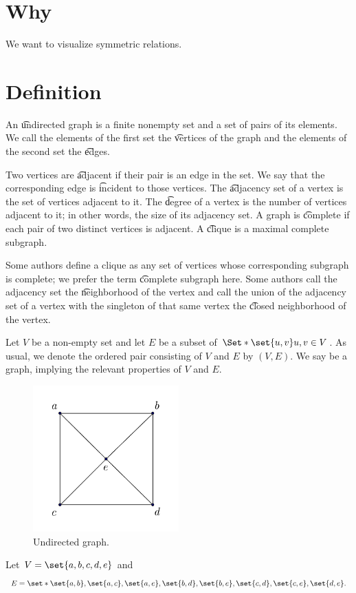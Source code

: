 
\section{Why}

We want to visualize symmetric relations.

\section{Definition}

An \t{undirected graph} is a finite nonempty set and a set of pairs of its elements.
We call the elements of the first set the \t{vertices} of the graph and the elements of the second set the \t{edges}.

Two vertices are \t{adjacent} if their pair is an edge in the set.
We say that the corresponding edge is \t{incident} to those vertices.
The \t{adjacency set} of a vertex is the set of vertices adjacent to it.
The \t{degree} of a vertex is the number of vertices adjacent to it; in other words, the size of its adjacency set.
A graph is \t{complete} if each pair of two distinct vertices is adjacent.
A \t{clique} is a maximal complete subgraph.


Some authors define a clique as any set of vertices whose corresponding subgraph is complete; we prefer the term \t{complete subgraph} here.
Some authors call the adjacency set the \t{neighborhood} of the vertex and call the union of the adjacency set of a vertex with the singleton of that same vertex the \t{closed neighborhood} of the vertex.


Let $V$ be a non-empty set and let $E$ be a subset of $\Set*{\set{u, v}}{u, v \in V}$.
As usual, we denote the ordered pair consisting of $V$ and $E$ by $(V, E)$.
We say  be a graph, implying the relevant properties of $V$ and $E$.


\begin{figure}
  \centering
  \includegraphics[width=0.5\textwidth]{graphics_included/undirected_graph}
  \caption{Undirected graph.}
\end{figure}

Let $V = \set{a, b, c, d, e}$
and
$$
  E = \set*{\set{a, b}, \set{a, c}, \set{a, e}, \set{b, d}, \set{b, e}, \set{c, d}, \set{c, e}, \set{d,e}}.
$$
